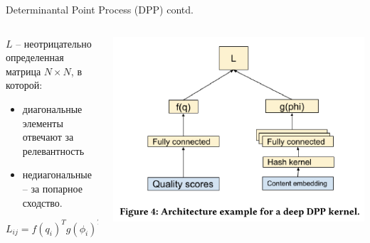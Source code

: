 \documentclass[11pt,aspectratio=169,handout]{beamer}
\begin{document}
\begin{frame}{Determinantal Point Process (DPP) contd.}

\begin{columns}

\begin{column}{0.45\textwidth}

$L$ – неотрицательно определенная матрица $N \times N$, в которой:
\begin{itemize}
\item диагональные элементы отвечают за релевантность
\item недиагональные – за попарное сходство.
\end{itemize}

\[
L_{ij} = f(q_i)^T g(\phi_i)^T g(\phi_i) f(q_i)
\]

\end{column}

\begin{column}{0.45\textwidth} 
\begin{center}
\includegraphics[scale=0.3]{images/dpp.png}
\end{center}
\end{column}

\end{columns}

\end{frame}
\end{document}
